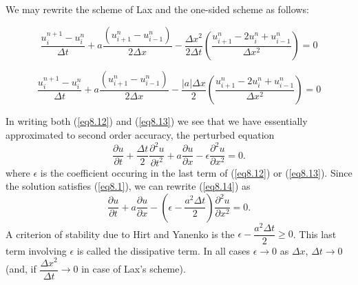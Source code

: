 \begin{remark}\label{chap8:rem8.1}
We may rewrite the scheme of Lax and the one-sided scheme as follows:

\medskip
{}
\begin{equation*}
\frac{u^{n+1}_i - u^n_i}{\Delta t} +  a\frac{(u^n_{i+1} -
  u^n_{i-1})}{2\Delta x} - \frac{\Delta x^2}{2 \Delta t}
\left(\frac{u^n_{i+1} - 2u^n_i + u^n_{i-1}}{\Delta x^2}\right) =0 
\tag{8.12}\label{eq8.12}
\end{equation*}

\medskip
{}
\begin{equation*}
\frac{u^{n+1}_i - u^n_i}{\Delta t} + a \frac{(u^n_{i+1} -
  u^n_{i-1})}{2\Delta x} -\frac{|a|\Delta x}{2} \left(\frac{u^n_{i+1} -
  2u^n_i + u^n_{i-1}}{\Delta x^2}\right) = 0 \tag{8.13}\label{eq8.13}
\end{equation*}

In writing both (\ref{eq8.12}) and (\ref{eq8.13}) we see that we have essentially approximated to second order accuracy, the perturbed equation
\begin{equation*}
\frac{\partial u}{\partial t} + \frac{\Delta t }{2} \frac{\partial^2
  u}{\partial t^2} + a \frac{\partial u}{\partial x} - \epsilon
\frac{\partial^2 u}{\partial x^2} = 0.\tag{8.14}\label{eq8.14} 
\end{equation*}
where $\epsilon$ is the coefficient occuring in the last term of
(\ref{eq8.12}) or (\ref{eq8.13}). Since the solution\pageoriginale
satisfies (\ref{eq8.1}), we can rewrite (\ref{eq8.14}) as  
\begin{equation*}
\frac{\partial u}{\partial t} + a  \frac{\partial u}{\partial x} -
\left(\epsilon - \frac{a^2 \Delta t}{2}\right) \frac{\partial^2 u}{\partial x^2}
= 0. 
\tag*{$(8.14)'$}\label{eq8.14'} 
\end{equation*}
A criterion of stability due to Hirt \cite{key15}  and Yanenko is the
$\epsilon - \dfrac{a^2 \Delta t}{2} \geq 0$. This last term involving
$\epsilon$ is called the dissipative term. In all cases $\epsilon \to
0$ as $\Delta x$, $\Delta t \to 0$ (and, if $\dfrac{\Delta x^2}{\Delta
  t} \to 0$ in case of Lax's scheme). 
\end{remark}

